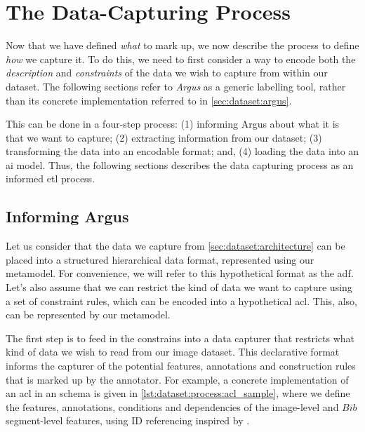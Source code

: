 \section{The Data-Capturing Process}
\label{sec:dataset:process}

Now that we have defined \textit{what} to mark up, we now describe the process to define \textit{how} we capture it. To do this, we need to first consider a way to encode both the  \textit{description} and \textit{constraints} of the data we wish to capture from within our dataset. The following sections refer to \textit{Argus} as a generic labelling tool, rather than its concrete implementation referred to in \cref{sec:dataset:argus}.

This can be done in a four-step process: (1) informing Argus about what it is that we want to capture; (2) extracting information from our dataset; (3) transforming the data into an encodable format; and, (4) loading the data into an \gls{ai} model. Thus, the following sections describes the data capturing process as an informed \gls{etl} process. 

\subsection{Informing Argus}
\label{sec:dataset:process:informing}

Let us consider that the data we capture from \cref{sec:dataset:architecture} can be placed into a structured hierarchical data format, represented using our metamodel. For convenience, we will refer to this hypothetical format as the \gls{adf}. Let's also assume that we can restrict the kind of data we want to capture using a set of constraint rules, which can be encoded into a hypothetical \gls{acl}. This, also, can be represented by our metamodel.

The first step is to feed in the constrains into a data capturer that restricts what kind of data we wish to read from our image dataset. This declarative format informs the capturer of the potential features, annotations and construction rules that is marked up by the annotator. For example, a concrete implementation of an \gls{acl} in an  schema is given in \cref{lst:dataset:process:acl_sample}, where we define the features, annotations, conditions and dependencies of the image-level and $Bib$ segment-level features, using ID referencing inspired by .

\clearpage

